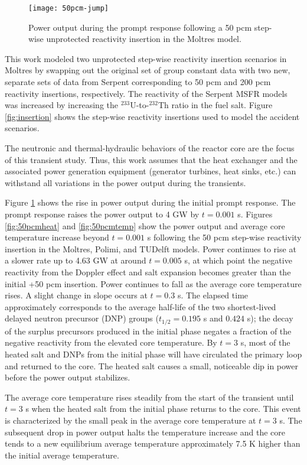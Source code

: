 \begin{figure}[htbp!]
    \centering
    \texttt{[image: 50pcm-jump]}
    \caption{Power output during the prompt response following a 50 pcm
    step-wise unprotected reactivity insertion in the Moltres model.}
    \label{fig:50pcmjump}
\end{figure}

This work modeled two unprotected step-wise reactivity insertion scenarios in
Moltres by swapping out the original set of group constant data with two new,
separate sets of data from Serpent corresponding to 50 pcm and 200 pcm
reactivity insertions, respectively. The reactivity of the Serpent \gls{MSFR}
models was increased by increasing the $^{233}$U-to-$^{232}$Th ratio in
the fuel salt. Figure \ref{fig:insertion} shows the step-wise reactivity
insertions used to model the accident scenarios.

The neutronic and thermal-hydraulic behaviors of the reactor core are the
focus of this transient study. Thus, this work assumes that the heat exchanger
and the associated power generation equipment (generator turbines, heat sinks,
etc.) can withstand all variations in the power output during the transients.

Figure \ref{fig:50pcmjump} shows the rise in power output during
the initial prompt response. The prompt
response raises the power output to 4 GW by $t=0.001$ s.
Figures \ref{fig:50pcmheat} and \ref{fig:50pcmtemp} show the power output and
average core temperature increase beyond $t=0.001$ s following the 50 pcm
step-wise reactivity insertion in the Moltres, Polimi, and TUDelft models.
Power continues to rise at a slower rate up to 4.63 GW at around $t=0.005$ s,
at which point the negative reactivity from the Doppler effect and salt
expansion becomes greater
than the initial +50 pcm insertion. Power continues to fall as the average
core temperature rises. A slight change in slope occurs at $t=0.3$ s. The
elapsed time approximately corresponds to the average half-life of the two
shortest-lived delayed neutron precursor (DNP) groups ($t_{1/2}=0.195$ s and
$0.424$ s); the decay of the surplus precursors produced in the initial phase
negates a fraction of the negative reactivity from the elevated core
temperature. By $t=3$ s, most of the heated salt and \glspl{DNP} from the
initial phase will have circulated the primary loop and returned to the
core. The heated salt causes a small, noticeable dip in power before the power
output stabilizes.

The average core temperature rises steadily from the start of the transient
until $t=3$ s when the heated salt from the initial phase returns to the core.
This event is characterized by the small peak in the average core temperature
at $t=3$ s. The subsequent drop in power output halts the temperature
increase and the core tends to a new equilibrium average temperature
approximately 7.5 K higher than the initial average temperature.

